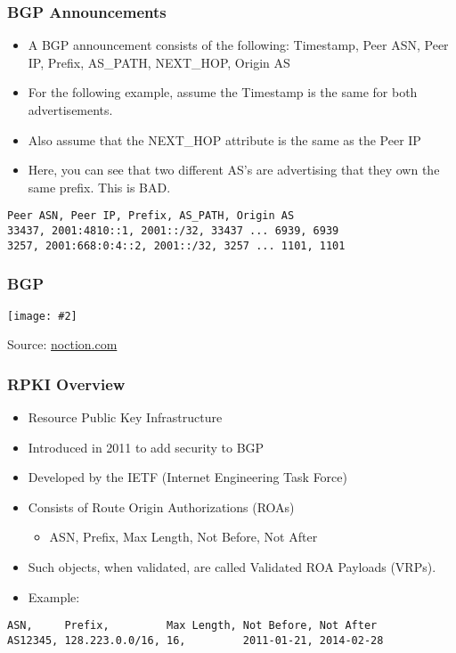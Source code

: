 \documentclass{beamer}
\newcommand{\framedgraphic}[3]{
    \begin{frame}
        \frametitle{#1}
        \begin{center}
            \texttt{[image: \#2]}
        \end{center}
        {\small Source: #3}
    \end{frame}
}
\begin{document}
\begin{frame}[fragile]
    \frametitle{BGP Announcements}

    \begin{itemize}
        \item A BGP announcement consists of the following: Timestamp, Peer ASN, Peer IP, Prefix, AS\_PATH, NEXT\_HOP, Origin AS\pause
        \item For the following example, assume the Timestamp is the same for both advertisements.\pause
        \item Also assume that the NEXT\_HOP attribute is the same as the Peer IP\pause
        \item Here, you can see that two different AS's are advertising that they own the same prefix. This is BAD.
    \end{itemize}

    \begin{Verbatim}[fontsize=\small]
Peer ASN, Peer IP, Prefix, AS_PATH, Origin AS
33437, 2001:4810::1, 2001::/32, 33437 ... 6939, 6939
3257, 2001:668:0:4::2, 2001::/32, 3257 ... 1101, 1101
    \end{Verbatim}
\end{frame}

\framedgraphic{BGP}{pictures/bgp.jpeg}{\href{http://www.noction.com/wp-content/uploads/2012/03/bgp.jpg}{noction.com}}

\begin{frame}[fragile]
    \frametitle{RPKI Overview}
    \pause
    \begin{itemize}
        \item Resource Public Key Infrastructure \pause
        \item Introduced in 2011 to add security to BGP \pause
        \item Developed by the IETF (Internet Engineering Task Force) \pause
        \item Consists of Route Origin Authorizations (ROAs)
        \begin{itemize}
            \item ASN, Prefix, Max Length, Not Before, Not After \pause
        \end{itemize}
        \item Such objects, when validated, are called Validated ROA Payloads (VRPs). \pause
        \item Example:
    \end{itemize}

    \begin{Verbatim}[fontsize=\small]
ASN,     Prefix,         Max Length, Not Before, Not After
AS12345, 128.223.0.0/16, 16,         2011-01-21, 2014-02-28
    \end{Verbatim}
\end{frame}
\end{document}
